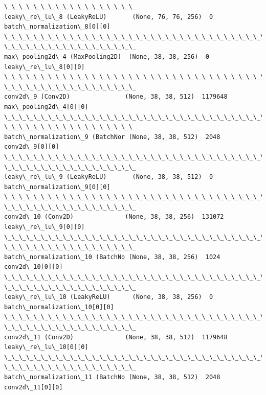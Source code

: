 \documentclass[11pt]{article}
\begin{document}
\begin{Verbatim}[commandchars=\\\{\}]
\_\_\_\_\_\_\_\_\_\_\_\_\_\_\_\_\_\_
leaky\_re\_lu\_8 (LeakyReLU)       (None, 76, 76, 256)  0
batch\_normalization\_8[0][0]
\_\_\_\_\_\_\_\_\_\_\_\_\_\_\_\_\_\_\_\_\_\_\_\_\_\_\_\_\_\_\_\_\_\_\_\_\_\_\_\_\_\_\_\_\_\_\_\_\_\_\_\_\_\_\_\_\_\_\_\_\_\_\_\_\_\_\_\_\_\_\_\_\_\_\_\_\_\_\_\_
\_\_\_\_\_\_\_\_\_\_\_\_\_\_\_\_\_\_
max\_pooling2d\_4 (MaxPooling2D)  (None, 38, 38, 256)  0
leaky\_re\_lu\_8[0][0]
\_\_\_\_\_\_\_\_\_\_\_\_\_\_\_\_\_\_\_\_\_\_\_\_\_\_\_\_\_\_\_\_\_\_\_\_\_\_\_\_\_\_\_\_\_\_\_\_\_\_\_\_\_\_\_\_\_\_\_\_\_\_\_\_\_\_\_\_\_\_\_\_\_\_\_\_\_\_\_\_
\_\_\_\_\_\_\_\_\_\_\_\_\_\_\_\_\_\_
conv2d\_9 (Conv2D)               (None, 38, 38, 512)  1179648
max\_pooling2d\_4[0][0]
\_\_\_\_\_\_\_\_\_\_\_\_\_\_\_\_\_\_\_\_\_\_\_\_\_\_\_\_\_\_\_\_\_\_\_\_\_\_\_\_\_\_\_\_\_\_\_\_\_\_\_\_\_\_\_\_\_\_\_\_\_\_\_\_\_\_\_\_\_\_\_\_\_\_\_\_\_\_\_\_
\_\_\_\_\_\_\_\_\_\_\_\_\_\_\_\_\_\_
batch\_normalization\_9 (BatchNor (None, 38, 38, 512)  2048        conv2d\_9[0][0]
\_\_\_\_\_\_\_\_\_\_\_\_\_\_\_\_\_\_\_\_\_\_\_\_\_\_\_\_\_\_\_\_\_\_\_\_\_\_\_\_\_\_\_\_\_\_\_\_\_\_\_\_\_\_\_\_\_\_\_\_\_\_\_\_\_\_\_\_\_\_\_\_\_\_\_\_\_\_\_\_
\_\_\_\_\_\_\_\_\_\_\_\_\_\_\_\_\_\_
leaky\_re\_lu\_9 (LeakyReLU)       (None, 38, 38, 512)  0
batch\_normalization\_9[0][0]
\_\_\_\_\_\_\_\_\_\_\_\_\_\_\_\_\_\_\_\_\_\_\_\_\_\_\_\_\_\_\_\_\_\_\_\_\_\_\_\_\_\_\_\_\_\_\_\_\_\_\_\_\_\_\_\_\_\_\_\_\_\_\_\_\_\_\_\_\_\_\_\_\_\_\_\_\_\_\_\_
\_\_\_\_\_\_\_\_\_\_\_\_\_\_\_\_\_\_
conv2d\_10 (Conv2D)              (None, 38, 38, 256)  131072
leaky\_re\_lu\_9[0][0]
\_\_\_\_\_\_\_\_\_\_\_\_\_\_\_\_\_\_\_\_\_\_\_\_\_\_\_\_\_\_\_\_\_\_\_\_\_\_\_\_\_\_\_\_\_\_\_\_\_\_\_\_\_\_\_\_\_\_\_\_\_\_\_\_\_\_\_\_\_\_\_\_\_\_\_\_\_\_\_\_
\_\_\_\_\_\_\_\_\_\_\_\_\_\_\_\_\_\_
batch\_normalization\_10 (BatchNo (None, 38, 38, 256)  1024        conv2d\_10[0][0]
\_\_\_\_\_\_\_\_\_\_\_\_\_\_\_\_\_\_\_\_\_\_\_\_\_\_\_\_\_\_\_\_\_\_\_\_\_\_\_\_\_\_\_\_\_\_\_\_\_\_\_\_\_\_\_\_\_\_\_\_\_\_\_\_\_\_\_\_\_\_\_\_\_\_\_\_\_\_\_\_
\_\_\_\_\_\_\_\_\_\_\_\_\_\_\_\_\_\_
leaky\_re\_lu\_10 (LeakyReLU)      (None, 38, 38, 256)  0
batch\_normalization\_10[0][0]
\_\_\_\_\_\_\_\_\_\_\_\_\_\_\_\_\_\_\_\_\_\_\_\_\_\_\_\_\_\_\_\_\_\_\_\_\_\_\_\_\_\_\_\_\_\_\_\_\_\_\_\_\_\_\_\_\_\_\_\_\_\_\_\_\_\_\_\_\_\_\_\_\_\_\_\_\_\_\_\_
\_\_\_\_\_\_\_\_\_\_\_\_\_\_\_\_\_\_
conv2d\_11 (Conv2D)              (None, 38, 38, 512)  1179648
leaky\_re\_lu\_10[0][0]
\_\_\_\_\_\_\_\_\_\_\_\_\_\_\_\_\_\_\_\_\_\_\_\_\_\_\_\_\_\_\_\_\_\_\_\_\_\_\_\_\_\_\_\_\_\_\_\_\_\_\_\_\_\_\_\_\_\_\_\_\_\_\_\_\_\_\_\_\_\_\_\_\_\_\_\_\_\_\_\_
\_\_\_\_\_\_\_\_\_\_\_\_\_\_\_\_\_\_
batch\_normalization\_11 (BatchNo (None, 38, 38, 512)  2048        conv2d\_11[0][0]

\end{Verbatim}
\end{document}
